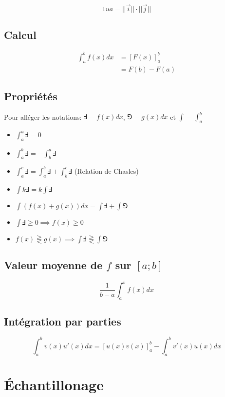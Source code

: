 \documentclass{article}
\begin{document}
$$
1 ua = ||\vec i||\cdot ||\vec j||
$$

\subsection{Calcul}

\begin{equation*}
    \begin{split}
        \int_a^b f(x) dx &= [F(x)]_a^b \\
                         &= F(b) - F(a)
    \end{split}
\end{equation*}

\subsection{Propriétés}

Pour alléger les notations: $\Finv = f(x)dx$, $\Game = g(x)dx$ et $\int = \int_a^b$

\begin{itemize}
    \item $\int_a^a \Finv = 0$
    \item $\int_a^b \Finv = -\int_b^a \Finv$
    \item $\int_a^c \Finv = \int_a^b \Finv + \int_b^c \Finv$   (Relation de Chasles)
    \item $\int k\Finv = k\int \Finv$
    \item $\int (f(x) + g(x))dx = \int \Finv + \int \Game$
    \item $\int \Finv \geq 0 \implies f(x) \geq 0$
    \item $f(x) \gtreqless g(x) \implies \int \Finv \gtreqless \int \Game$
\end{itemize}

\subsection{Valeur moyenne de $f$ sur $[a; b]$}

\[\frac{1}{b-a}\int_a^b f(x)dx\]

\subsection{Intégration par parties}

\[
	\int_a^b v(x)u'(x) dx = [u(x)v(x)]_a^b - \int_a^b v'(x)u(x) dx
\] 

\newpage\section{Échantillonage}
\end{document}
